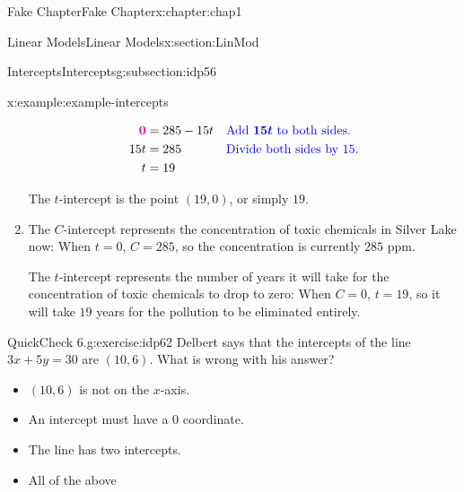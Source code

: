 \documentclass[oneside,10pt,]{book}
\numberwithin{equation}{section}
\newcommand{\alert}[1]{\boldsymbol{\color{magenta}{#1}}}
\newcommand{\blert}[1]{\boldsymbol{\color{blue}{#1}}}
\newcommand{\amp}{&}
\begin{document}
\begin{chapterptx}{Fake Chapter}{}{Fake Chapter}{}{}{x:chapter:chap1}
\begin{sectionptx}{Linear Models}{}{Linear Models}{}{}{x:section:LinMod}
\begin{subsectionptx}{Intercepts}{}{Intercepts}{}{}{g:subsection:idp56}
\begin{example}{}{x:example:example-intercepts}
\begin{enumerate}[label=\alph*]
\begin{equation*}
\begin{aligned}[t]
\alert{0}\amp =285-15t \amp \amp \blert{\text{Add }15t \text{ to both sides.}}\\
15t\amp =285  \amp \amp \blert{\text{Divide both sides by 15.}}\\
t\amp =19 
\end{aligned}
\end{equation*}
%
\par
The \(t\)-intercept is the point \((19,0)\), or simply \(19\).%
\item{}The \(C\)-intercept represents the concentration of toxic chemicals in Silver Lake now:  When  \(t=0\), \(C=285\),  so the concentration is currently \(285\) ppm.%
\par
The \(t\)-intercept represents the number of years it will take for the concentration of toxic chemicals to drop to zero:  When \(C=0\), \(t=19\),  so it will take \(19\) years for the pollution to be eliminated entirely.%
\end{enumerate}
%
\end{example}
\begin{inlineexercise}{QuickCheck 6.}{g:exercise:idp62}%
Delbert says that the intercepts of the line \(3x+5y=30\) are \((10,6)\text{.}\) What is wrong with his answer?%
\par
\begin{itemize}[label=$\odot$,leftmargin=3em,]
\item{}\((10,6)\) is not on the \(x\)-axis.%

\item{}An intercept must have a 0 coordinate.%

\item{}The line has two intercepts.%

\item{}All of the above%


\end{itemize}
\end{inlineexercise}
\end{subsectionptx}
\end{sectionptx}
\end{chapterptx}
\end{document}
